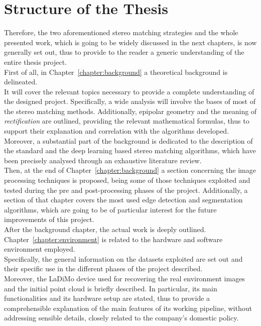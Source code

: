 \section{Structure of the Thesis}
\label{section:structure-of-thesis} 

Therefore, the two aforementioned stereo matching strategies and the whole presented work, which is going to be widely discussed in the next chapters, is now generally set out, thus to provide to the reader a generic understanding of the entire thesis project. \\ 
First of all, in Chapter~\ref{chapter:background} a theoretical background is delineated.\\
It will cover the relevant topics necessary to provide a complete understanding of the designed project.
Specifically, a wide analysis will involve the bases of most of the stereo matching methods.
Additionally, epipolar geometry and the meaning of \textit{rectification} are outlined, providing the relevant mathematical formulas, thus to support their explanation and correlation with the algorithms developed. \\
Moreover, a substantial part of the background is dedicated to the description of the standard and the deep learning based stereo matching algorithms, which have been precisely analysed through an exhaustive literature review.\\
Then, at the end of Chapter~\ref{chapter:background} a section concerning the image processing techniques is proposed, being some of those techniques exploited and tested during the pre and post-processing phases of the project.
Additionally, a section of that chapter covers the most used edge detection and segmentation algorithms, which are going to be of particular interest for the future improvements of this project.\\
After the background chapter, the actual work is deeply outlined.
Chapter~\ref{chapter:environment} is related to the hardware and software environment employed.\\
Specifically, the general information on the datasets exploited are set out and their specific use in the different phases of the project described.\\
Moreover, the LaDiMo device used for recovering the real environment images and the initial point cloud is briefly described. 
In particular, its main functionalities and its hardware setup are stated, thus to provide a comprehensible explanation of the main features of its working pipeline, without addressing sensible details, closely related to the company's domestic policy.\\
